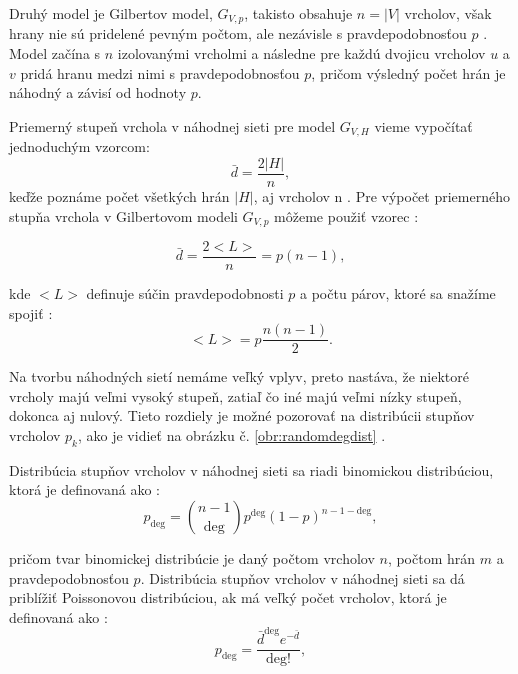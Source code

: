 Druhý model je Gilbertov model, $G_{V,p}$, takisto obsahuje $n = |V|$ vrcholov, však hrany nie sú pridelené pevným počtom,
ale nezávisle s pravdepodobnosťou $p$ \cite{gilbert1959random}\cite{barabasi2016network} . Model začína s $n$ izolovanými vrcholmi a následne pre každú dvojicu vrcholov
$u$ a $v$ pridá hranu medzi nimi s pravdepodobnosťou $p$, pričom výsledný počet hrán je náhodný a závisí od hodnoty $p$.

Priemerný stupeň vrchola v náhodnej sieti pre model $G_{V,H}$ vieme vypočítať jednoduchým vzorcom:
\begin{equation}
    \bar{d} = \frac{2|H|}{n},
    \label{eq:avg_degree_random}
\end{equation}
keďže poznáme počet všetkých hrán $|H|$, aj vrcholov n \cite{barabasi2016network} . Pre výpočet priemerného stupňa vrchola
v Gilbertovom modeli $G_{V,p}$ môžeme použiť vzorec \cite{barabasi2016network} :

\begin{equation}
    \bar{d} = \frac{2<L>}{n} = p(n-1),
    \label{eq:avg_degree_gilbert}
\end{equation}

kde $<L>$ definuje súčin pravdepodobnosti $p$ a počtu párov, ktoré sa snažíme spojiť \cite{barabasi2016network} :
\begin{equation}
    <L> = p\frac{n(n-1)}{2}.
    \label{eq:avg_edges_gilbert}
\end{equation}

Na tvorbu náhodných sietí nemáme veľký vplyv, preto nastáva, že niektoré vrcholy majú veľmi vysoký stupeň, 
zatiaľ čo iné majú veľmi nízky stupeň, dokonca aj nulový. Tieto rozdiely je možné pozorovať na distribúcii
stupňov vrcholov $p_k$, ako je vidieť na obrázku č. \ref{obr:randomdegdist} \cite{barabasi2016network} .

Distribúcia stupňov vrcholov v náhodnej sieti sa riadi binomickou distribúciou, ktorá je definovaná ako \cite{barabasi2016network} :
\begin{equation}
    p_{\mathrm{deg}} = \binom{n-1}{\mathrm{deg}} p^{\mathrm{deg}} (1-p)^{n-1-\mathrm{deg}},
    \label{eq:binomial_distribution}        
\end{equation}

pričom tvar binomickej distribúcie je daný počtom vrcholov $n$, počtom hrán $m$ a pravdepodobnosťou $p$.
Distribúcia stupňov vrcholov v náhodnej sieti sa dá priblížiť Poissonovou distribúciou, ak má veľký počet vrcholov,
ktorá je definovaná ako \cite{barabasi2016network} :
\begin{equation}
    p_{\mathrm{deg}} = \frac{\bar{d}^{\mathrm{deg}} e^{-\bar{d}}}{\mathrm{deg}!},
    \label{eq:poisson_distribution}
\end{equation}

